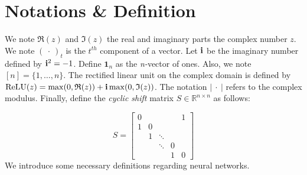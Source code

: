 \section{Notations \& Definition}
We note $\mathfrak{R}(z)$ and $\mathfrak{I}(z)$  the real and imaginary parts the complex number $z$. We note $\left(\ \cdot\ \right)_{t}$ is the $t^{th}$ component of a vector. Let $\mathbf{i}$ be the imaginary number defined by $\mathbf{i}^2=-1$. 
Define $\mathbf{1}_{n}$ as the \emph{n-}vector of ones. Also, we note $[n]=\{1,\ldots , n\}$. The rectified linear unit on the complex domain is defined by $\relu(z)=\max\left(0,\mathfrak{R}(z)\right)+\ci\max\left(0,\mathfrak{I}(z)\right)$. The notation $\left|\ \cdot\ \right|$ refers to the complex modulus.
Finally, define the \emph{cyclic shift }matrix $S \in \mathbb{R}^{n\times n}$ as follows: 

\begin{equation}
  S = \left[ \begin{array}{ccccc}
  0 &  &  &  & 1 \\
  1 & 0 \\
   & 1 & \ddots \\
   &  & \ddots & 0 \\
   &  &  & 1 & 0
  \end{array}\right]
\end{equation}
We introduce some necessary definitions regarding neural networks.  



